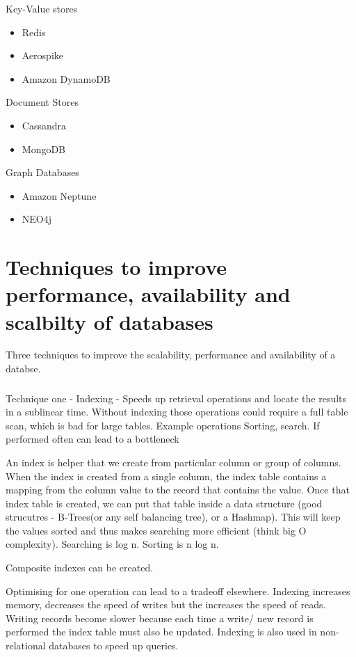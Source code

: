 \documentclass[a4paper, 11pt]{book}
\begin{document}
    Key-Value stores
    \begin{itemize}
        \item Redis
        \item Aerospike
        \item Amazon DynamoDB
    \end{itemize}
    Document Stores
    \begin{itemize}
        \item Cassandra
        \item MongoDB
    \end{itemize}
    Graph Databases
    \begin{itemize}
        \item Amazon Neptune
        \item NEO4j
    \end{itemize}


    \section{Techniques to improve performance, availability and scalbilty of databases}
    Three techniques to improve the scalability, performance and availability of a databse.

    \subsubsection{}
    Technique one - Indexing - Speeds up retrieval operations and locate the results in a sublinear time.
    Without indexing those operations could require a full table scan, which is bad for large tables.
    Example operations
    Sorting, search.
    If performed often can lead to a bottleneck

    An index is helper that we create from particular column or group of columns.
    When the index is created from a single column, the index table contains a mapping from the column value to the record that contains the value.
    Once that index table is created, we can put that table inside a data structure (good strucutres - B-Trees(or any self balancing tree), or a Hashmap).
    This will keep the values sorted and thus makes searching more efficient (think big O complexity).
    Searching is log n.
    Sorting is n log n.

    Composite indexes can be created.


    Optimising for one operation can lead to a tradeoff elsewhere.
    Indexing increases memory, decreases the speed of writes but the increases the speed of reads.
    Writing records become slower because each time a write/ new record is performed the index table must also be updated.
    Indexing is also used in non-relational databases to speed up queries.
\end{document}

